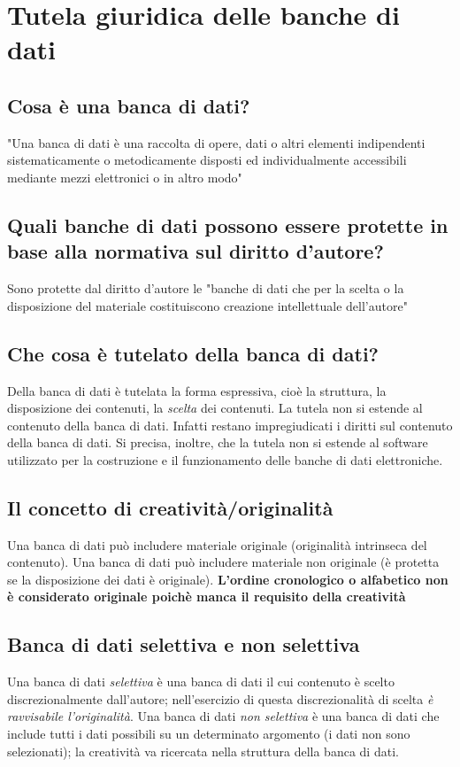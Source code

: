 \newpage
\section{Tutela giuridica delle banche di dati}

\subsection{Cosa è una banca di dati?}
"Una banca di dati è una raccolta di opere, dati o altri elementi indipendenti sistematicamente
o metodicamente disposti ed individualmente accessibili mediante mezzi elettronici o in altro
modo"

\subsection{Quali banche di dati possono essere protette in base alla normativa sul diritto d'autore?}
Sono protette dal diritto d'autore le "banche di dati che per la scelta o la disposizione
del materiale costituiscono creazione intellettuale dell'autore"

\subsection{Che cosa è tutelato della banca di dati?}
Della banca di dati è tutelata la forma espressiva, cioè la struttura, la disposizione dei contenuti,
la \emph{scelta} dei contenuti.\newline
La tutela non si estende al contenuto della banca di dati. Infatti restano impregiudicati i diritti sul contenuto
della banca di dati.\newline
Si precisa, inoltre, che la tutela non si estende al software utilizzato per la costruzione e il
funzionamento delle banche di dati elettroniche.

\subsection{Il concetto di creatività/originalità}
Una banca di dati può includere materiale originale (originalità intrinseca del contenuto).\newline
Una banca di dati può includere materiale non originale (è protetta se la disposizione dei dati
è originale).\newline
\textbf{L'ordine cronologico o alfabetico non è considerato originale poichè manca il requisito
della creatività}

\subsection{Banca di dati selettiva e non selettiva}
Una banca di dati \emph{selettiva} è una banca di dati il cui contenuto è scelto discrezionalmente
dall'autore; nell'esercizio di questa discrezionalità di scelta \emph{è ravvisabile l'originalità}.\newline
Una banca di dati \emph{non selettiva} è una banca di dati che include tutti i dati possibili su un determinato
argomento (i dati non sono selezionati); la creatività va ricercata nella struttura della banca di dati.

